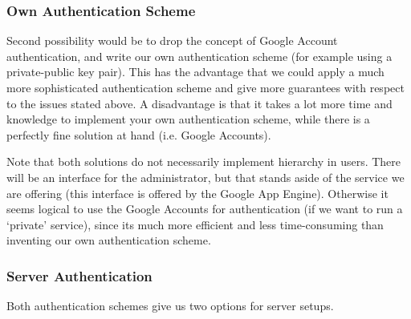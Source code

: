 
\subsubsection{Own Authentication Scheme}
Second possibility would be to drop the concept of Google Account authentication,
and write our own authentication scheme (for example using a private-public key
pair). This has the advantage that we could apply a much more sophisticated
authentication scheme and give more guarantees with respect to the issues stated
above. A disadvantage is that it takes a lot more time and knowledge to implement
your own authentication scheme, while there is a perfectly fine solution at hand
(i.e. Google Accounts).

Note that both solutions do not necessarily implement hierarchy in users. There
will be an interface for the administrator, but that stands aside of the service
we are offering (this interface is offered by the Google App Engine). Otherwise
it seems logical to use the Google Accounts for authentication (if we want to run
a `private' service), since its much more efficient and less time-consuming than
inventing our own authentication scheme.


\subsubsection{Server Authentication}
Both authentication schemes give us two options for server setups.

